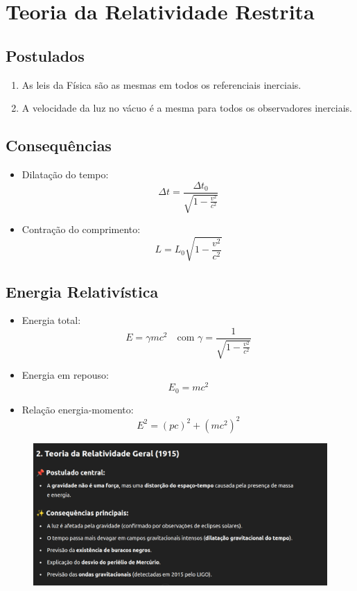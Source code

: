 \documentclass[a4paper,12pt]{article}
\begin{document}
\section*{Teoria da Relatividade Restrita}
\subsection*{Postulados}
\begin{enumerate}
    \item As leis da Física são as mesmas em todos os referenciais inerciais.
    \item A velocidade da luz no vácuo é a mesma para todos os observadores inerciais.
\end{enumerate}

\subsection*{Consequências}
\begin{itemize}
    \item Dilatação do tempo:
    \[
        \Delta t = \frac{\Delta t_0}{\sqrt{1 - \frac{v^2}{c^2}}}
    \]
    \item Contração do comprimento:
    \[
        L = L_0 \sqrt{1 - \frac{v^2}{c^2}}
    \]
\end{itemize}

\subsection*{Energia Relativística}
\begin{itemize}
    \item Energia total:
    \[
        E = \gamma m c^2
    \quad \text{com } \gamma = \frac{1}{\sqrt{1 - \frac{v^2}{c^2}}}
    \]
    \item Energia em repouso:
    \[
        E_0 = m c^2
    \]
    \item Relação energia-momento:
    \[
        E^2 = (pc)^2 + (m c^2)^2
    \]
\end{itemize}

\begin{center}
\begin{figure}[h!]
    \centering
    \includegraphics[width=1\textwidth]{figures/teoria_relatividade.png}
\end{figure}
\end{center}
\end{document}
